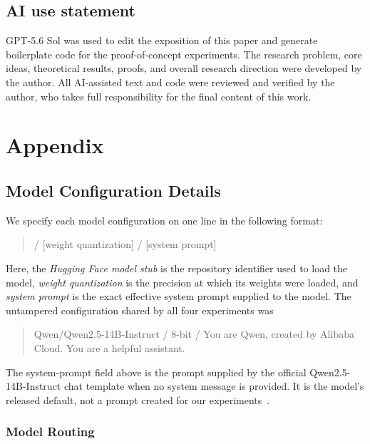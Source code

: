 \documentclass{article}
\begin{document}
\subsection*{AI use statement}

GPT-5.6 Sol was used to edit the exposition of this paper and generate
boilerplate code for the proof-of-concept experiments. The research problem,
core ideas, theoretical results, proofs, and overall research direction were
developed by the author. All AI-assisted text and code were reviewed and
verified by the author, who takes full responsibility for the final content of
this work.




\appendix

\section{Appendix}

\subsection{Model Configuration Details}
\label{app:proof-of-concept-configurations}

We specify each model configuration on one line in the following format:
\begin{quote}
  \small{} / [weight quantization] / [system prompt]
\end{quote}
Here, the \emph{Hugging Face model stub} is the repository identifier used to
load the model, \emph{weight quantization} is the precision at which its
weights were loaded, and \emph{system prompt} is the exact effective system
prompt supplied to the model. The untampered configuration shared by all four
experiments was
\begin{quote}
  \small\ttfamily
  Qwen/Qwen2.5-14B-Instruct / 8-bit / You are Qwen, created by Alibaba Cloud.
  You are a helpful assistant.
\end{quote}
The system-prompt field above is the prompt supplied by the official
Qwen2.5-14B-Instruct chat template when no system message is provided. It is
the model's released default, not a prompt created for our
experiments~\citep{qwen25_14b_instruct_hf}.

\subsubsection{Model Routing}
\label{app:proof-of-concept-configurations-model-routing}
\end{document}

